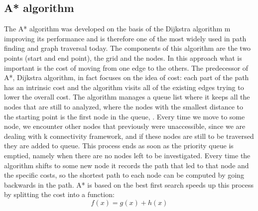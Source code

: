 \subsection{A* algorithm}
The A* algorithm was developed on the basis of the Dijkstra algorithm m improving its performance and is therefore one of the most widely used in path finding and graph traversal today.
The components of this algorithm are the two points (start and end point), the grid and the nodes. 
In this approach what is important is the cost of moving from one edge to the others.
The predecessor of A*, Dijkstra algorithm, in fact focuses on the idea of cost: each part of the path has an intrinsic cost and the algorithm visits all of the existing edges trying to lower the overall cost. The algorithm manages a queue list where it keeps all the nodes that are still to analyzed, where the nodes with the smallest distance to the starting point is the first node in the queue, \citet{herzog}.
Every time we move to some node, we encounter other nodes that previously were unaccessible, since we are dealing with k connectivity framework, and if these nodes are still to be traversed they are added to queue. This process ends as soon as the priority queue is emptied, namely when there are no nodes left to be investigated.
Every time the algorithm shifts to some new node it records the path that led to that node and the specific costs, so the shortest path to each node can be computed by going backwards in the path.
A* is based on the best first search speeds up this process by splitting the cost into a function:
\begin{equation}
    f(x) = g(x) + h(x)
\end{equation}

